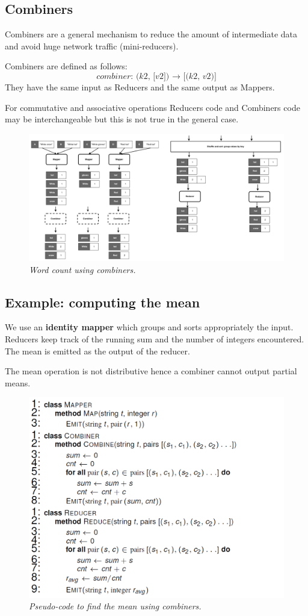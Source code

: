 \subsection{Combiners}
Combiners are a general mechanism to reduce the amount of intermediate data and avoid huge network traffic (mini-reducers).
\par
Combiners are defined as follows:
\[
\textit{combiner: (k2, [v2]) $\rightarrow$ [(k2, v2)]}
\]
They have the same input as Reducers and the same output as Mappers.
\par
For commutative and associative operations Reducers code and Combiners code may be interchangeable but this is not true in the general case.
\begin{figure}[h!]
	\includegraphics[width=\linewidth]{images/combiners.png}
	\caption{\textit{Word count using combiners.}}
\end{figure}
\subsection{Example: computing the mean}
We use an \textbf{identity mapper} which groups and sorts appropriately the input. Reducers keep track of the running sum and the number of integers encountered. The mean is emitted as the output of the reducer.
\par
The mean operation is not distributive hence a combiner cannot output partial means. 
\begin{figure}[h!]
	\includegraphics[width=\linewidth]{images/meanpseudocode.png}
	\caption{\textit{Pseudo-code to find the mean using combiners.}}
\end{figure}
